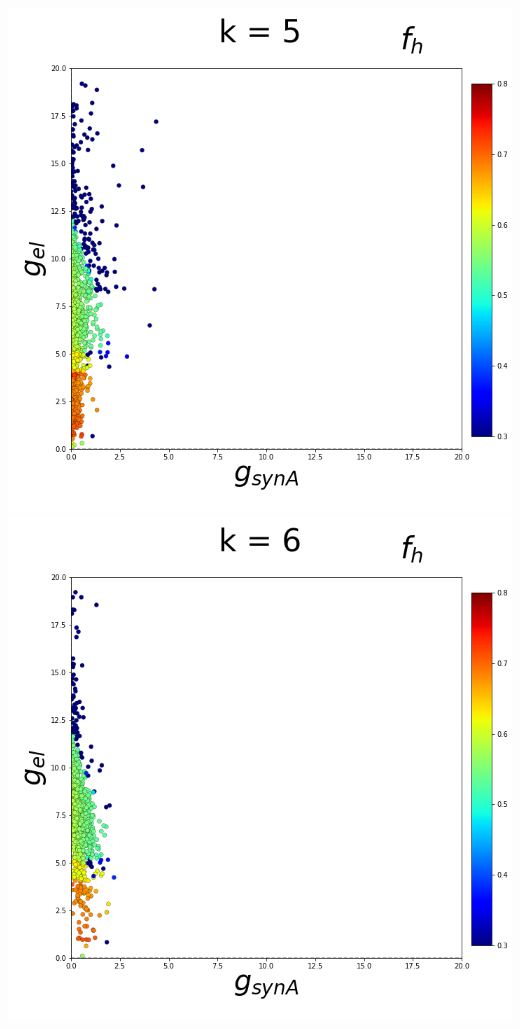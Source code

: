\documentclass[11pt]{article}
\begin{document}
\begin{center}
\includegraphics[scale=0.125]{DSN_figs/STGCircuit_DSN_c=2_rs=3_k=5.png}
\includegraphics[scale=0.125]{DSN_figs/STGCircuit_DSN_c=2_rs=3_k=6.png}

\end{center}
\end{document}
